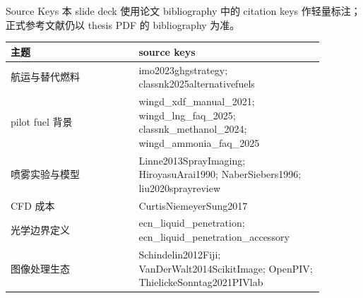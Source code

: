 \documentclass[aspectratio=169,11pt]{beamer}
\begin{document}
\begin{frame}{Source Keys}
\small
本 slide deck 使用论文 bibliography 中的 citation keys 作轻量标注；正式参考文献仍以 thesis PDF 的 bibliography 为准。

\vspace{0.7em}
\begin{tabular}{L{0.36\linewidth}L{0.52\linewidth}}
\toprule
主题 & source keys \\
\midrule
航运与替代燃料 & imo2023ghgstrategy; classnk2025alternativefuels \\
pilot fuel 背景 & wingd\_xdf\_manual\_2021; wingd\_lng\_faq\_2025; classnk\_methanol\_2024; wingd\_ammonia\_faq\_2025 \\
喷雾实验与模型 & Linne2013SprayImaging; HiroyasuArai1990; NaberSiebers1996; liu2020sprayreview \\
CFD 成本 & CurtisNiemeyerSung2017 \\
光学边界定义 & ecn\_liquid\_penetration; ecn\_liquid\_penetration\_accessory \\
图像处理生态 & Schindelin2012Fiji; VanDerWalt2014ScikitImage; OpenPIV; ThielickeSonntag2021PIVlab \\
\bottomrule
\end{tabular}
\end{frame}
\end{document}
